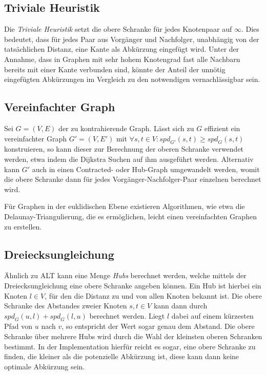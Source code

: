 \subsection{Triviale Heuristik}

Die \emph{Triviale Heuristik} setzt die obere Schranke für jedes Knotenpaar auf $\infty$.
Dies bedeutet, dass für jedes Paar aus Vorgänger und Nachfolger, unabhängig von der tatsächlichen Distanz, eine Kante als Abkürzung eingefügt wird.
Unter der Annahme, dass in Graphen mit sehr hohem Knotengrad fast alle Nachbarn bereits mit einer Kante verbunden sind, könnte der Anteil der unnötig eingefügten Abkürzungen im Vergleich zu den notwendigen vernachlässigbar sein.

\subsection{Vereinfachter Graph}

Sei $G = (V, E)$ der zu kontrahierende Graph.
Lässt sich zu $G$ effizient ein vereinfachter Graph $G' = (V, E')$ mit $\forall s, t \in V \colon {spd}_{G'} (s, t) \geq {spd}_{G} (s, t)$ konstruieren, so kann dieser zur Berechnung der oberen Schranke verwendet werden, etwa indem die Dijkstra Suchen auf ihm ausgeführt werden.
Alternativ kann $G'$ auch in einen Contracted- oder Hub-Graph umgewandelt werden, womit die obere Schranke dann für jedes Vorgänger-Nachfolger-Paar einzelnen berechnet wird.

Für Graphen in der euklidischen Ebene existieren Algorithmen, wie etwa die Delaunay-Triangulierung, die es ermöglichen, leicht einen vereinfachten Graphen zu erstellen.

\subsection{Dreiecksungleichung}

Ähnlich zu ALT\cite{goldberg2005computing} kann eine Menge \emph{Hubs} berechnet werden, welche mittels der Dreiecksungleichung eine obere Schranke angeben können.
Ein Hub ist hierbei ein Knoten $l \in V$, für den die Distanz zu und von allen Knoten bekannt ist.
Die obere Schranke des Abstandes zweier Knoten $s, t \in V$ kann dann durch ${spd}_G (u, l) + {spd}_G (l, u)$ berechnet werden.
Liegt $l$ dabei auf einem kürzesten Pfad von $u$ nach $v$, so entspricht der Wert sogar genau dem Abstand.
Die obere Schranke über mehrere Hubs wird durch die Wahl der kleinsten oberen Schranken bestimmt.
In der Implementation hierfür reicht es sogar, eine obere Schranke zu finden, die kleiner als die potenzielle Abkürzung ist, diese kann dann keine optimale Abkürzung sein.

